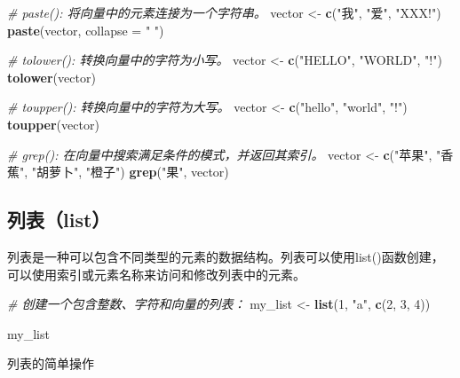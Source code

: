\documentclass[]{book}
\newenvironment{Shaded}{\begin{snugshade}}{\end{snugshade}}
\newcommand{\CommentTok}[1]{\textcolor[rgb]{0.56,0.35,0.01}{\textit{#1}}}
\newcommand{\DataTypeTok}[1]{\textcolor[rgb]{0.13,0.29,0.53}{#1}}
\newcommand{\DecValTok}[1]{\textcolor[rgb]{0.00,0.00,0.81}{#1}}
\newcommand{\KeywordTok}[1]{\textcolor[rgb]{0.13,0.29,0.53}{\textbf{#1}}}
\newcommand{\NormalTok}[1]{#1}
\newcommand{\StringTok}[1]{\textcolor[rgb]{0.31,0.60,0.02}{#1}}
\begin{document}
\begin{Shaded}
\begin{Highlighting}[]
\CommentTok{# paste(): 将向量中的元素连接为一个字符串。}
\NormalTok{vector <-}\StringTok{ }\KeywordTok{c}\NormalTok{(}\StringTok{"我"}\NormalTok{, }\StringTok{"爱"}\NormalTok{, }\StringTok{"XXX!"}\NormalTok{)}
\KeywordTok{paste}\NormalTok{(vector, }\DataTypeTok{collapse =} \StringTok{" "}\NormalTok{)}

\CommentTok{# tolower(): 转换向量中的字符为小写。}
\NormalTok{vector <-}\StringTok{ }\KeywordTok{c}\NormalTok{(}\StringTok{"HELLO"}\NormalTok{, }\StringTok{"WORLD"}\NormalTok{, }\StringTok{"!"}\NormalTok{)}
\KeywordTok{tolower}\NormalTok{(vector)}

\CommentTok{# toupper(): 转换向量中的字符为大写。}
\NormalTok{vector <-}\StringTok{ }\KeywordTok{c}\NormalTok{(}\StringTok{"hello"}\NormalTok{, }\StringTok{"world"}\NormalTok{, }\StringTok{"!"}\NormalTok{)}
\KeywordTok{toupper}\NormalTok{(vector)}

\CommentTok{# grep(): 在向量中搜索满足条件的模式，并返回其索引。}
\NormalTok{vector <-}\StringTok{ }\KeywordTok{c}\NormalTok{(}\StringTok{"苹果"}\NormalTok{, }\StringTok{"香蕉"}\NormalTok{, }\StringTok{"胡萝卜"}\NormalTok{, }\StringTok{"橙子"}\NormalTok{)}
\KeywordTok{grep}\NormalTok{(}\StringTok{"果"}\NormalTok{, vector)}
\end{Highlighting}
\end{Shaded}

\hypertarget{ux5217ux8868list}{%
\subsection{列表（list）}\label{ux5217ux8868list}}

列表是一种可以包含不同类型的元素的数据结构。列表可以使用list()函数创建，可以使用索引或元素名称来访问和修改列表中的元素。

\begin{Shaded}
\begin{Highlighting}[]
\CommentTok{# 创建一个包含整数、字符和向量的列表：}
\NormalTok{my_list <-}\StringTok{ }\KeywordTok{list}\NormalTok{(}\DecValTok{1}\NormalTok{, }\StringTok{"a"}\NormalTok{, }\KeywordTok{c}\NormalTok{(}\DecValTok{2}\NormalTok{, }\DecValTok{3}\NormalTok{, }\DecValTok{4}\NormalTok{))}

\NormalTok{my_list}
\end{Highlighting}
\end{Shaded}

列表的简单操作
\end{document}
